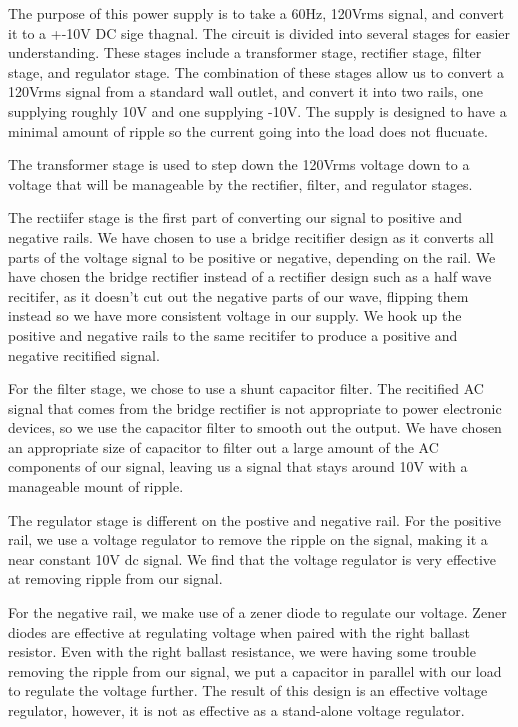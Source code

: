 \documentclass[12pt]{article}
\begin{document}
The purpose of this power supply is to take a 60Hz, 120Vrms signal, and convert it to a +-10V DC sige thagnal. The circuit is divided into
several stages for easier understanding. These stages include a transformer stage, rectifier stage, filter stage, and regulator stage. The combination 
of these stages allow us to convert a 120Vrms signal from a standard wall outlet, and convert it into two rails, one supplying roughly 10V and one supplying -10V. 
The supply is designed to have a minimal amount of ripple so the current going into the load does not flucuate.

The transformer stage is used to step down the 120Vrms voltage down to a voltage that will be manageable by the rectifier, filter, and regulator stages.

The rectiifer stage is the first part of converting our signal to positive and negative rails. We have chosen to use a bridge recitifier design as it converts all parts of the voltage signal 
to be positive or negative, depending on the rail. We have chosen the bridge rectifier instead of a rectifier design such as a half wave recitifer, as it doesn't cut out the negative parts of our wave, flipping them instead 
so we have more consistent voltage in our supply. We hook up the positive and negative rails to the same recitifer to produce a positive and negative recitified signal.

For the filter stage, we chose to use a shunt capacitor filter. The recitified AC signal that comes from the bridge rectifier is not appropriate to power electronic devices, so we use the capacitor filter to smooth out the output. We have chosen 
an appropriate size of capacitor to filter out a large amount of the AC components of our signal, leaving us a signal that stays around 10V with a manageable mount of ripple.

The regulator stage is different on the postive and negative rail. For the positive rail, we use a voltage regulator to remove the ripple on the signal, making it a near constant 10V dc signal. We find that the voltage regulator is very effective at removing 
ripple from our signal.

For the negative rail, we make use of a zener diode to regulate our voltage. Zener diodes are effective at regulating voltage when paired with the right ballast resistor. Even with the right ballast resistance, we were having some trouble removing the ripple from our signal, 
we put a capacitor in parallel with our load to regulate the voltage further. The result of this design is an effective voltage regulator, however, it is not as effective as a stand-alone voltage regulator.
\end{document}
